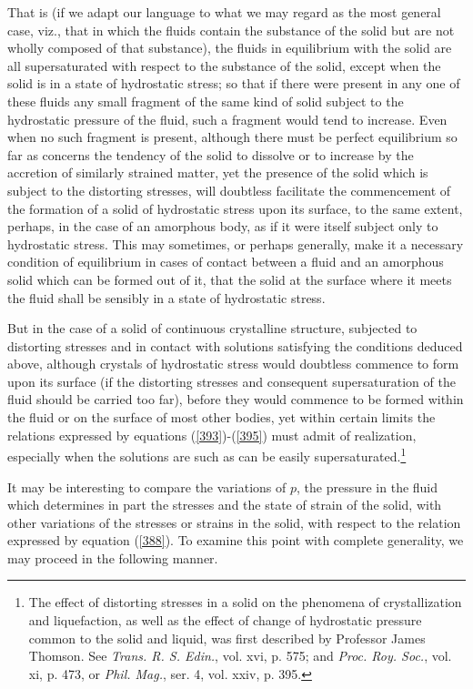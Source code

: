 \documentclass[12pt]{article}
\begin{document}
{That is (if we adapt our language to what we may regard as the most general case, viz., that in which the fluids contain the substance of the solid but are not wholly composed of that substance), the fluids in equilibrium with the solid are all supersaturated with respect to the substance of the solid, except when the solid is in a state of hydrostatic stress; so that if there were present in any one of these fluids any small fragment of the same kind of solid subject to the hydrostatic pressure of the fluid, such a fragment would tend to increase. Even when no such fragment is present, although there must be perfect equilibrium so far as concerns the tendency of the solid to dissolve or to increase by the accretion of similarly strained matter, yet the presence of the solid which is subject to the distorting stresses, will doubtless facilitate the commencement of the formation of a solid of hydrostatic stress upon its surface, to the same extent, perhaps, in the case of an amorphous body, as if it were itself subject only to hydrostatic stress. This may sometimes, or perhaps generally, make it a necessary condition of equilibrium in cases of contact between a fluid and an amorphous solid which can be formed out of it, that the solid at the surface where it meets the fluid shall be sensibly in a state of hydrostatic stress.


But in the case of a solid of continuous crystalline structure, subjected to distorting stresses and in contact with solutions satisfying the conditions deduced above, although crystals of hydrostatic stress would doubtless commence to form upon its surface (if the distorting stresses and consequent supersaturation of the fluid should be carried too far), before they would commence to be formed within the fluid or on the surface of most other bodies, yet within certain limits the relations expressed by equations (\ref{393})-(\ref{395}) must admit of realization, especially when the solutions are such as can be easily supersaturated.\footnote{The effect of distorting stresses in a solid on the phenomena of crystallization and liquefaction, as well as the effect of change of hydrostatic pressure common to the solid and liquid, was first described by Professor James Thomson. See \textit{Trans. R. S. Edin.}, vol. xvi, p. 575; and \textit{Proc. Roy. Soc.}, vol. xi, p. 473, or \textit{Phil. Mag.}, ser. 4, vol. xxiv, p. 395.} 


It may be interesting to compare the variations of $p$, the pressure in the fluid which determines in part the stresses and the state of strain of the solid, with other variations of the stresses or strains in the solid, with respect to the relation expressed by equation (\ref{388}). To examine this point with complete generality, we may proceed in the following manner.


}
\end{document}
